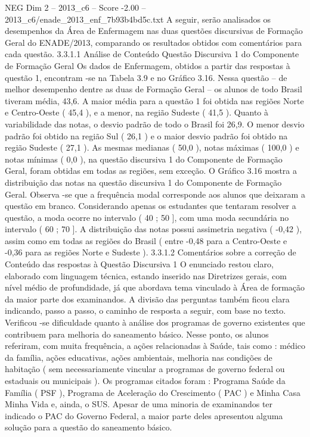 \begin{textsample}{NEG Dim 2 – 2013\_c6 – Score -2.00 – 2013\_c6/enade\_2013\_enf\_7b93b4bd5c.txt}
A seguir, serão analisados os desempenhos da Área de Enfermagem nas duas questões discursivas de Formação Geral do ENADE/2013, comparando os resultados obtidos com comentários para cada questão. 3.3.1.1 Análise de Conteúdo Questão Discursiva 1 do Componente de Formação Geral Os dados de Enfermagem, obtidos a partir das respostas à questão 1, encontram -se na Tabela 3.9 e no Gráfico 3.16.
Nessa questão – de melhor desempenho dentre as duas de Formação Geral – os alunos de todo Brasil tiveram média, 43,6.
A maior média para a questão 1 foi obtida nas regiões Norte e Centro-Oeste ( 45,4 ), e a menor, na região Sudeste ( 41,5 ).
Quanto à variabilidade das notas, o desvio padrão de todo o Brasil foi 26,9.
O menor desvio padrão foi obtido na região Sul ( 26,1 ) e o maior desvio padrão foi obtido na região Sudeste ( 27,1 ).
As mesmas medianas ( 50,0 ), notas máximas ( 100,0 ) e notas mínimas ( 0,0 ), na questão discursiva 1 do Componente de Formação Geral, foram obtidas em todas as regiões, sem exceção.
O Gráfico 3.16 mostra a distribuição das notas na questão discursiva 1 do Componente de Formação Geral.
Observa -se que a frequência modal corresponde aos alunos que deixaram a questão em branco.
Considerando apenas os estudantes que tentaram resolver a questão, a moda ocorre no intervalo ( 40 ; 50 ], com uma moda secundária no intervalo ( 60 ; 70 ].
A distribuição das notas possui assimetria negativa ( -0,42 ), assim como em todas as regiões do Brasil ( entre -0,48 para a Centro-Oeste e -0,36 para as regiões Norte e Sudeste ). 3.3.1.2 Comentários sobre a correção de Conteúdo das respostas à Questão Discursiva 1 O enunciado restou claro, elaborado com linguagem técnica, estando inserido nas Diretrizes gerais, com nível médio de profundidade, já que abordava tema vinculado à Área de formação da maior parte dos examinandos.
A divisão das perguntas também ficou clara indicando, passo a passo, o caminho de resposta a seguir, com base no texto.
Verificou -se dificuldade quanto à análise dos programas de governo existentes que contribuem para melhoria do saneamento básico.
Nesse ponto, os alunos referiram, com muita frequência, a ações relacionadas à Saúde, tais como : médico da família, ações educativas, ações ambientais, melhoria nas condições de habitação ( sem necessariamente vincular a programas de governo federal ou estaduais ou municipais ).
Os programas citados foram : Programa Saúde da Família ( PSF ), Programa de Aceleração do Crescimento ( PAC ) e Minha Casa Minha Vida e, ainda, o SUS.
Apesar de uma minoria de examinandos ter indicado o PAC do Governo Federal, a maior parte deles apresentou alguma solução para a questão do saneamento básico.

\end{textsample}
